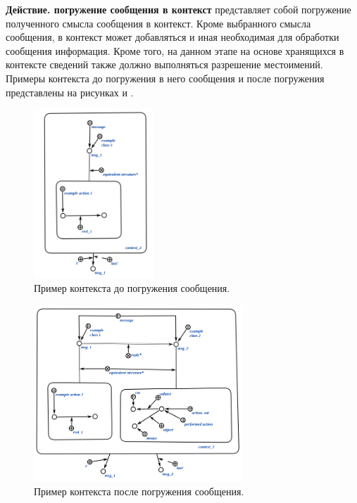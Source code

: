 \textbf{Действие. погружение сообщения в контекст} представляет собой погружение полученного смысла сообщения в контекст.
Кроме выбранного смысла сообщения, в контекст может добавляться и иная необходимая для обработки сообщения информация.
Кроме того, на данном этапе на основе хранящихся в контексте сведений также должно выполняться разрешение местоимений.
Примеры контекста до погружения в него сообщения и после погружения представлены на рисунках \textit{} и \textit{}.

\begin{figure}[h]
    \centering
    \includegraphics[width=0.4\textwidth]{images/part4/chapter_nl_interfaces/context_1.png}
    \caption{Пример контекста до погружения сообщения.}
    \label{fig:context_before_update}
\end{figure}

\begin{figure}[h]
    \centering
    \includegraphics[width=0.7\textwidth]{images/part4/chapter_nl_interfaces/context_2.png}
    \caption{Пример контекста после погружения сообщения.}
    \label{fig:updated_context}
\end{figure}

